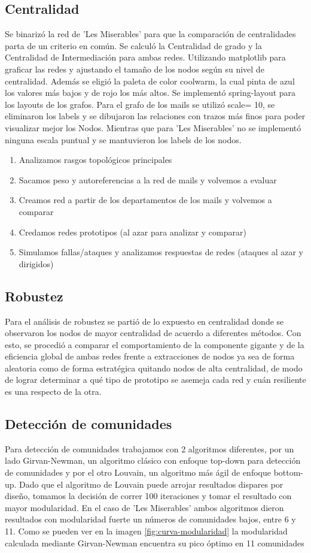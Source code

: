 \documentclass[conference]{IEEEtran}
\begin{document}
\subsection{Centralidad}
Se binarizó la red de 'Les Miserables' para que la comparación de centralidades parta de un criterio en común.
Se calculó la Centralidad de grado y la Centralidad de Intermediación para ambas redes. 
Utilizando matplotlib para graficar las redes y ajustando el tamaño de los nodos según su nivel de centralidad. Además se eligió la paleta de color coolwarm, la cual pinta de azul los valores más bajos y de rojo los más altos. 
Se implementó spring-layout para los layouts de los grafos. Para el grafo de los mails se utilizó scale= 10, se eliminaron los labels y se dibujaron las relaciones con trazos más finos para poder visualizar mejor los Nodos. Mientras que para 'Les Miserables' no se implementó ninguna escala puntual y se mantuvieron los labels de los nodos.
\begin{enumerate}
    \item Analizamos rasgos topológicos principales
    \item Sacamos peso y autoreferencias a la red de mails y volvemos a evaluar
    \item Creamos red a partir de los departamentos de los mails y volvemos a comparar
    \item Credamos redes prototipos (al azar para analizar y comparar)
    \item Simulamos fallas/ataques y analizamos respuestas de redes (ataques al azar y dirigidos)
\end{enumerate}


\subsection{Robustez}
Para el análisis de robustez se partió de lo expuesto en centralidad donde se observaron los nodos de mayor centralidad de acuerdo a diferentes métodos. Con esto, se procedió a comparar el comportamiento de la componente gigante y de la eficiencia global de ambas redes frente a extracciones de nodos ya sea de forma aleatoria como de forma estratégica quitando nodos de alta centralidad, de modo de lograr determinar a qué tipo de prototipo se asemeja cada red y cuán resiliente es una respecto de la otra. 
\subsection{Detección de comunidades}
Para detección de comunidades trabajamos con 2 algoritmos diferentes, por un lado  Girvan-Newman, un algoritmo clásico con enfoque top-down para detección de comunidades y por el otro Louvain, un algoritmo más ágil de enfoque bottom-up.
Dado que el algoritmo de Louvain puede arrojar resultados dispares por diseño, tomamos la decisión de correr 100 iteraciones y tomar el resultado con mayor modularidad.
En el caso de 'Les Miserables' ambos algoritmos dieron resultados con modularidad fuerte un números de comunidades bajos, entre 6 y 11. Como se pueden ver en la imagen \ref{fig:curva-modularidad} la modularidad calculada mediante Girvan-Newman encuentra su pico óptimo en 11 comunidades
\end{document}
